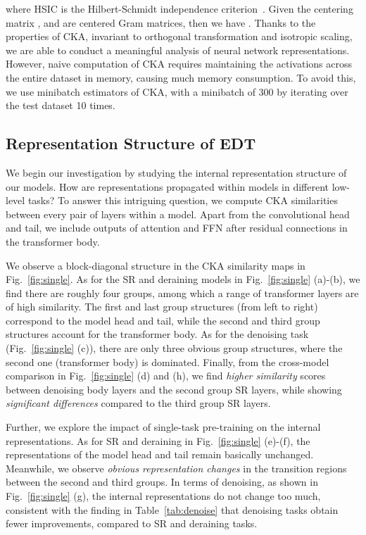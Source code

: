 \documentclass[runningheads]{llncs}
\begin{document}
	where HSIC is the Hilbert-Schmidt independence criterion~\cite{gretton2007kernel}. Given the centering matrix ,  and  are centered Gram matrices, then we have . Thanks to the properties of CKA, invariant to orthogonal transformation and isotropic scaling, we are able to conduct a meaningful analysis of neural network representations.  However, naive computation of CKA requires maintaining the activations across the entire dataset in memory, causing much memory consumption. To avoid this, we use minibatch estimators of CKA\cite{nguyen2020wide}, with a minibatch of 300 by iterating over the test dataset 10 times.
	
	\subsection{Representation Structure of EDT}
\label{sec:finetune}
	
	We begin our investigation by studying the internal representation structure of our models. How are representations propagated within models in different low-level tasks?  To answer this intriguing question, we compute CKA similarities between every pair of layers within a model. Apart from the convolutional head and tail, we include outputs of attention and FFN after residual connections in the transformer body.
	
	We observe a block-diagonal structure in the CKA similarity maps in Fig.~\ref{fig:single}. As for the SR and deraining models in Fig.~\ref{fig:single} (a)-(b), we find there are roughly four groups, among which a range of transformer layers are of high similarity. The first and last group structures (from left to right) correspond to the model head and tail, while the second and third group structures account for the transformer body. As for the denoising task (Fig.~\ref{fig:single} (c)), there are only three obvious group structures, where the second one (transformer body) is dominated. Finally, from the cross-model comparison in Fig.~\ref{fig:single} (d) and (h), we find \textit{higher similarity} scores between denoising body layers and the second group SR layers, while showing \textit{significant differences} compared to the third group SR layers.
	
	Further, we explore the impact of single-task pre-training on the internal representations. As for SR and deraining in Fig.~\ref{fig:single} (e)-(f), the representations of the model head and tail remain basically unchanged. Meanwhile, we observe \textit{obvious representation changes} in the transition regions between the second and third groups. In terms of denoising, as shown in Fig.~\ref{fig:single} (g), the internal representations do not change too much, consistent with the finding in Table~\ref{tab:denoise} that denoising tasks obtain fewer improvements, compared to SR and deraining tasks.
	
\end{document}
